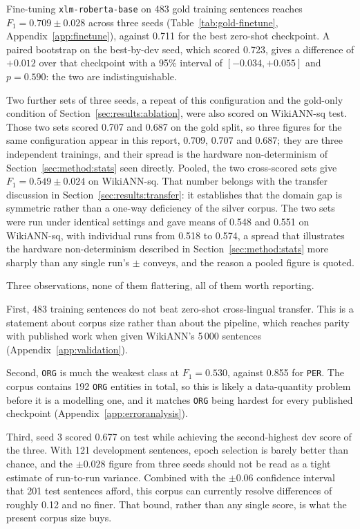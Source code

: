 Fine-tuning \texttt{xlm-roberta-base} on 483 gold training sentences reaches $F_1 = 0.709 \pm 0.028$ across three seeds (Table~\ref{tab:gold-finetune}, Appendix~\ref{app:finetune}), against 0.711 for the best zero-shot checkpoint. A paired bootstrap on the best-by-dev seed, which scored 0.723, gives a difference of $+0.012$ over that checkpoint with a 95\% interval of $[-0.034, +0.055]$ and $p = 0.590$: the two are indistinguishable.

Two further sets of three seeds, a repeat of this configuration and the gold-only condition of Section~\ref{sec:results:ablation}, were also scored on WikiANN-sq test. Those two sets scored 0.707 and 0.687 on the gold split, so three figures for the same configuration appear in this report, 0.709, 0.707 and 0.687; they are three independent trainings, and their spread is the hardware non-determinism of Section~\ref{sec:method:stats} seen directly. Pooled, the two cross-scored sets give $F_1 = 0.549 \pm 0.024$ on WikiANN-sq. That number belongs with the transfer discussion in Section~\ref{sec:results:transfer}: it establishes that the domain gap is symmetric rather than a one-way deficiency of the silver corpus. The two sets were run under identical settings and gave means of 0.548 and 0.551 on WikiANN-sq, with individual runs from 0.518 to 0.574, a spread that illustrates the hardware non-determinism described in Section~\ref{sec:method:stats} more sharply than any single run's $\pm$ conveys, and the reason a pooled figure is quoted.

Three observations, none of them flattering, all of them worth reporting.

First, 483 training sentences do not beat zero-shot cross-lingual transfer. This is a statement about corpus size rather than about the pipeline, which reaches parity with published work when given WikiANN's 5\,000 sentences (Appendix~\ref{app:validation}).

Second, \texttt{ORG} is much the weakest class at $F_1 = 0.530$, against 0.855 for \texttt{PER}. The corpus contains 192 \texttt{ORG} entities in total, so this is likely a data-quantity problem before it is a modelling one, and it matches \texttt{ORG} being hardest for every published checkpoint (Appendix~\ref{app:erroranalysis}).

Third, seed 3 scored 0.677 on test while achieving the second-highest dev score of the three. With 121 development sentences, epoch selection is barely better than chance, and the $\pm 0.028$ figure from three seeds should not be read as a tight estimate of run-to-run variance. Combined with the $\pm 0.06$ confidence interval that 201 test sentences afford, this corpus can currently resolve differences of roughly 0.12 and no finer. That bound, rather than any single score, is what the present corpus size buys.

